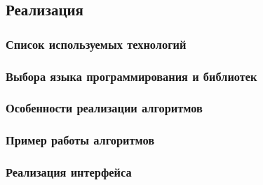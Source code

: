 \subsection{Реализация}
\subsubsection{Список используемых технологий}
\subsubsection{Выбора языка программирования и библиотек}
\subsubsection{Особенности реализации алгоритмов}
\subsubsection{Пример работы алгоритмов}
\subsubsection{Реализация интерфейса}